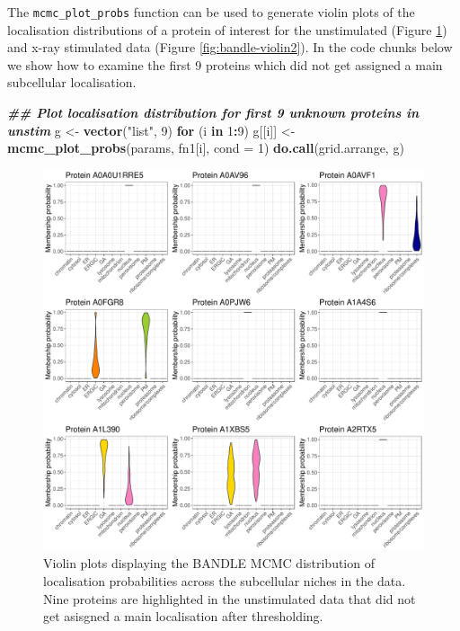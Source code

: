 \documentclass[9pt,a4paper,]{extarticle}
\newenvironment{Shaded}{\begin{snugshade}}{\end{snugshade}}
\newcommand{\AttributeTok}[1]{\textcolor[rgb]{0.13,0.29,0.53}{#1}}
\newcommand{\ControlFlowTok}[1]{\textcolor[rgb]{0.13,0.29,0.53}{\textbf{#1}}}
\newcommand{\DecValTok}[1]{\textcolor[rgb]{0.00,0.00,0.81}{#1}}
\newcommand{\DocumentationTok}[1]{\textcolor[rgb]{0.56,0.35,0.01}{\textbf{\textit{#1}}}}
\newcommand{\FunctionTok}[1]{\textcolor[rgb]{0.13,0.29,0.53}{\textbf{#1}}}
\newcommand{\NormalTok}[1]{#1}
\newcommand{\OtherTok}[1]{\textcolor[rgb]{0.56,0.35,0.01}{#1}}
\newcommand{\SpecialCharTok}[1]{\textcolor[rgb]{0.81,0.36,0.00}{\textbf{#1}}}
\newcommand{\StringTok}[1]{\textcolor[rgb]{0.31,0.60,0.02}{#1}}
\begin{document}
The \texttt{mcmc\_plot\_probs} function can be used to generate violin plots of the
localisation distributions of a protein of interest for the unstimulated (Figure
\ref{fig:bandle-violin1}) and x-ray stimulated data (Figure
\ref{fig:bandle-violin2}). In the code chunks below we show how to examine the
first 9 proteins which did not get assigned a main subcellular localisation.

\begin{Shaded}
\begin{Highlighting}[]
\DocumentationTok{\#\# Plot localisation distribution for first 9 unknown proteins in unstim}
\NormalTok{g }\OtherTok{\textless{}{-}} \FunctionTok{vector}\NormalTok{(}\StringTok{"list"}\NormalTok{, }\DecValTok{9}\NormalTok{)}
\ControlFlowTok{for}\NormalTok{ (i }\ControlFlowTok{in} \DecValTok{1}\SpecialCharTok{:}\DecValTok{9}\NormalTok{) }
\NormalTok{  g[[i]] }\OtherTok{\textless{}{-}} \FunctionTok{mcmc\_plot\_probs}\NormalTok{(params, fn1[i], }\AttributeTok{cond =} \DecValTok{1}\NormalTok{)}
\FunctionTok{do.call}\NormalTok{(grid.arrange, g)}
\end{Highlighting}
\end{Shaded}

\begin{figure}[H]

{\centering \includegraphics[width=1\linewidth,]{figs/unstim_unknown_violins} 

}

\caption{Violin plots displaying the BANDLE MCMC distribution of localisation probabilities across the subcellular niches in the data. Nine proteins are highlighted in the unstimulated data that did not get asisgned a main localisation after thresholding.}\label{fig:bandle-violin1}
\end{figure}
\end{document}
